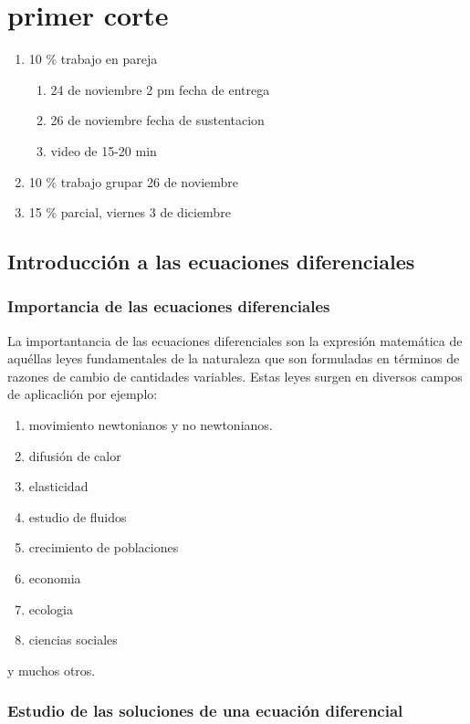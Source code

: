 \documentclass{book}
\begin{document}
    \chapter{primer corte}
    \begin{enumerate}
        \item 10 \% trabajo en pareja\begin{enumerate}
            \item 24 de noviembre 2 pm fecha de entrega
            \item 26 de noviembre fecha de sustentacion 
            \item video de 15-20 min 
        \end{enumerate}
        \item 10 \% trabajo grupar 26 de noviembre 
        \item 15 \% parcial, viernes 3 de diciembre
    \end{enumerate}
    \section{Introducción a las ecuaciones diferenciales}


    \subsection{Importancia de las ecuaciones diferenciales}
    La importantancia de las ecuaciones diferenciales son la expresión 
    matemática de aquéllas leyes fundamentales 
    de la naturaleza que son formuladas en términos de razones de cambio
    de cantidades variables.
    Estas leyes surgen en diversos campos de aplicaclión por ejemplo:

    \begin{enumerate}
        \item movimiento newtonianos y no newtonianos.
        \item difusión de calor
        \item elasticidad
        \item estudio de fluidos
        \item crecimiento de poblaciones 
        \item economia
        \item ecologia
        \item ciencias sociales 
    \end{enumerate}

    y muchos otros.
    \subsection{Estudio de las soluciones de una ecuación diferencial}
\end{document}
